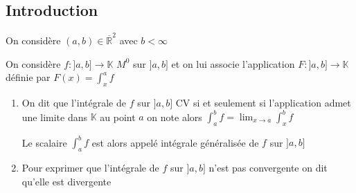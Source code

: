 \documentclass[11pt,hidelinks]{book}
\theoremstyle{mytheoremstyle}
\theoremstyle{mytheoremstyle}
\theoremstyle{mytheoremstyle}
\theoremstyle{mytheoremstyle}
\theoremstyle{mytheoremstyle}
\theoremstyle{mytheoremstyle}
\theoremstyle{mytheoremstyle}
\theoremstyle{mytheoremstyle}
\theoremstyle{myproblemstyle}
\def\mbb#1{\mathbb{#1}}
\def\bR{\mbb{R}}
\def\ib#1{\int_{a}^{b} #1}
\def\bK{\mbb{K}}
\def\abc{]a,b]}
\newcommand{\func}[3]{#1\colon#2\to#3}
\begin{document}
    \subsection{Introduction} On considère $(a,b) \in \overline{\bR}^2$ avec $b < \infty$ 
    \begin{definition}
        On considère $\func{f}{\abc}{\bK}$ $M^0$ sur $\abc$ et on lui associe 
        l'application $\func{F}{\abc}{\bK}$ définie par $F(x) = \int_{x}^{a} f$
        \begin{enumerate} 
        \item On dit que l'intégrale de $f$ sur $\abc$ CV si et seulement si 
        l'application admet une limite dans $\bK$ au point $a$ on note alors 
        $\ib{f} = \lim_{x \to a} \int_{x}^{b} f$
        
        \begin{rmq}
        Le scalaire $\ib{f}$ est alors appelé intégrale généralisée de $f$ sur $\abc$ 
        \end{rmq}

        \item Pour exprimer que l'intégrale de $f$ sur $\abc$ n'est pas convergente on dit qu'elle est 
        divergente 
    \end{enumerate}
    \end{definition}
\end{document}

